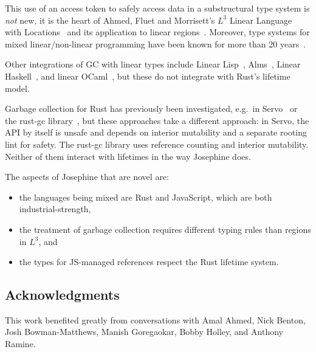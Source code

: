 This use of an access token to safely access data in a substructural
type system is \emph{not} new, it is the heart of Ahmed, Fluet and
Morrisett's $L^3$ Linear Language with Locations~\cite{l3} and its
application to linear regions~\cite{regions}.
Moreover, type systems for mixed linear/non-linear programming have
been known for more than 20 years~\cite{mixed}.

Other integrations of GC with linear types include Linear Lisp~\cite{linear-lisp},
Alms~\cite{alms},
Linear Haskell~\cite{linear-haskell}, and
linear OCaml~\cite{linear-ocaml}, but these do not integrate with Rust's
lifetime model.

Garbage collection for Rust has previously been investigated,
e.g.~in Servo~\cite{servo-gc} or the rust-gc library~\cite{rust-gc},
but these approaches take a different approach: in Servo, the
API by itself is unsafe and depends on interior mutability and
a separate rooting lint for safety. The rust-gc library uses
reference counting and interior mutability. Neither of them interact
with lifetimes in the way Josephine does.

The aspects of Josephine that are novel are:
\begin{itemize}

\item the languages being mixed are Rust and 
  JavaScript, which are both industrial-strength,

\item the treatment of garbage collection requires
  different typing rules than regions in $L^3$, and

\item the types for JS-managed references respect the Rust
  lifetime system.

\end{itemize}

\subsection*{Acknowledgments}

This work benefited greatly from conversations with
Amal Ahmed,
Nick Benton,
Josh Bowman-Matthews,
Manish Goregaokar,
Bobby Holley, and
Anthony Ramine.
